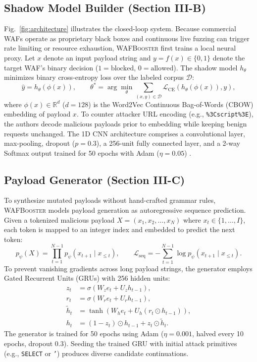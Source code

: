 \documentclass[conference]{IEEEtran}
\newcommand{\WAF}{\textsc{WAF}}
\newcommand{\WAFB}{\textsc{WAFBooster}}
\begin{document}
\subsection{Shadow Model Builder (Section III-B)}
Fig.~\ref{fig:architecture} illustrates the closed-loop system. Because commercial \WAF{}s operate as proprietary black boxes and continuous live fuzzing can trigger rate limiting or resource exhaustion, \WAFB{} first trains a local neural proxy. Let $x$ denote an input payload string and $y = f(x) \in \{0,1\}$ denote the target \WAF{}'s binary decision ($1=\text{blocked}$, $0=\text{allowed}$). The shadow model $h_{\theta}$ minimizes binary cross-entropy loss over the labeled corpus $\mathcal{D}$:
\begin{equation}
\hat{y}=h_{\theta}(\phi(x)), \qquad
\theta^*=\arg\min_{\theta}\sum_{(x,y)\in\mathcal{D}}
\mathcal{L}_{\mathrm{CE}}\!\left(h_{\theta}(\phi(x)),y\right),
\label{eq:shadow}
\end{equation}
where $\phi(x) \in \mathbb{R}^{d}$ ($d=128$) is the Word2Vec Continuous Bag-of-Words (CBOW) embedding of payload $x$. To counter attacker URL encoding (e.g., \texttt{\%3Cscript\%3E}), the authors decode malicious payloads prior to embedding while keeping benign requests unchanged. The 1D CNN architecture comprises a convolutional layer, max-pooling, dropout ($p=0.3$), a 256-unit fully connected layer, and a 2-way Softmax output trained for 50 epochs with Adam ($\eta=0.05$) \cite{wu2025}.

\subsection{Payload Generator (Section III-C)}
To synthesize mutated payloads without hand-crafted grammar rules, \WAFB{} models payload generation as autoregressive sequence prediction. Given a tokenized malicious payload $X=(x_1,x_2,\ldots,x_N)$ where $x_t \in \{1,\ldots,I\}$, each token is mapped to an integer index and embedded to predict the next token:
\begin{equation}
p_{\psi}(X)=\prod_{t=1}^{N-1}p_{\psi}(x_{t+1}\mid x_{\le t}), \qquad
\mathcal{L}_{\mathrm{seq}}=-\sum_{t=1}^{N-1}\log p_{\psi}(x_{t+1}\mid x_{\le t}).
\label{eq:seq}
\end{equation}
To prevent vanishing gradients across long payload strings, the generator employs Gated Recurrent Units (GRUs) with 256 hidden units:
\begin{align}
z_t &= \sigma(W_z e_t+U_z h_{t-1}), \label{eq:gru_z}\\
r_t &= \sigma(W_r e_t+U_r h_{t-1}), \label{eq:gru_r}\\
\tilde{h}_t &= \tanh\!\left(W_h e_t + U_h(r_t\odot h_{t-1})\right), \label{eq:gru_htilde}\\
h_t &= (1-z_t)\odot h_{t-1}+z_t\odot\tilde{h}_t. \label{eq:gru_h}
\end{align}
The generator is trained for 50 epochs using Adam ($\eta=0.001$, halved every 10 epochs, dropout $0.3$). Seeding the trained GRU with initial attack primitives (e.g., \texttt{SELECT} or \texttt{'}) produces diverse candidate continuations.
\end{document}
